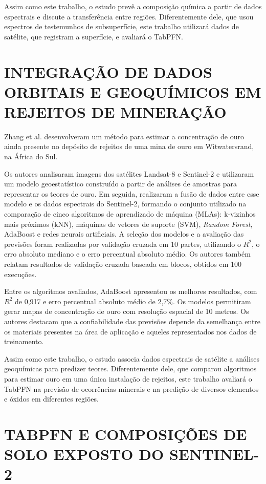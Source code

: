 Assim como este trabalho, o estudo prevê a composição química a partir de dados espectrais e discute a transferência entre regiões. Diferentemente dele, que usou espectros de testemunhos de subsuperfície, este trabalho utilizará dados de satélite, que registram a superfície, e avaliará o TabPFN.

\section{INTEGRAÇÃO DE DADOS ORBITAIS E GEOQUÍMICOS EM REJEITOS DE MINERAÇÃO}

Zhang et al. \cite{zhang2023} desenvolveram um método para estimar a concentração de ouro ainda presente no depósito de rejeitos de uma mina de ouro em Witwatersrand, na África do Sul.

Os autores analisaram imagens dos satélites Landsat-8 e Sentinel-2 e utilizaram um modelo geoestatístico construído a partir de análises de amostras para representar os teores de ouro. Em seguida, realizaram a fusão de dados entre esse modelo e os dados espectrais do Sentinel-2, formando o conjunto utilizado na comparação de cinco algoritmos de aprendizado de máquina (MLAs): k-vizinhos mais próximos (kNN), máquinas de vetores de suporte (SVM), \textit{Random Forest}, AdaBoost e redes neurais artificiais. A seleção dos modelos e a avaliação das previsões foram realizadas por validação cruzada em 10 partes, utilizando o $R^2$, o erro absoluto mediano e o erro percentual absoluto médio. Os autores também relatam resultados de validação cruzada baseada em blocos, obtidos em 100 execuções.

Entre os algoritmos avaliados, AdaBoost apresentou os melhores resultados, com $R^2$ de 0,917 e erro percentual absoluto médio de 2,7\%. Os modelos permitiram gerar mapas de concentração de ouro com resolução espacial de 10 metros. Os autores destacam que a confiabilidade das previsões depende da semelhança entre os materiais presentes na área de aplicação e aqueles representados nos dados de treinamento.

Assim como este trabalho, o estudo associa dados espectrais de satélite a análises geoquímicas para predizer teores. Diferentemente dele, que comparou algoritmos para estimar ouro em uma única instalação de rejeitos, este trabalho avaliará o TabPFN na previsão de ocorrências minerais e na predição de diversos elementos e óxidos em diferentes regiões.

\section{TABPFN E COMPOSIÇÕES DE SOLO EXPOSTO DO SENTINEL-2}

